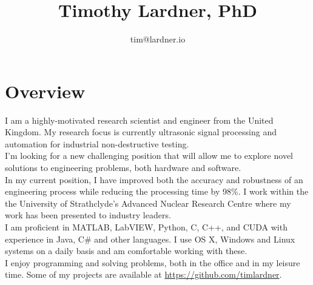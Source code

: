 \documentclass[12pt]{article}
\title{\bfseries\Huge Timothy Lardner, PhD}
\author{tim@lardner.io}
\date{}
\let\stdsection\section
\begin{document}
\section*{Overview}
I am a highly-motivated research scientist and engineer from the United Kingdom. My research focus is currently ultrasonic signal processing and automation for industrial non-destructive testing.\\[5pt]

I'm looking for a new challenging position that will allow me to explore novel solutions to engineering problems, both hardware and software.\\[5pt]

In my current position, I have improved both the accuracy and robustness of an engineering process while reducing the processing time by 98\%. I work within the the University of Strathclyde's Advanced Nuclear Research Centre where my work has been presented to industry leaders.\\[5pt]

I am proficient in MATLAB, LabVIEW, Python, C, C++, and CUDA with experience in Java, C\# and other languages. I use OS X, Windows and Linux systems on a daily basis and am comfortable working with these.\\[5pt]

I enjoy programming and solving problems, both in the office and in my leisure time. Some of my projects are available at \url{https://github.com/timlardner}.


\renewcommand\section{\newpage\stdsection}
\end{document}
